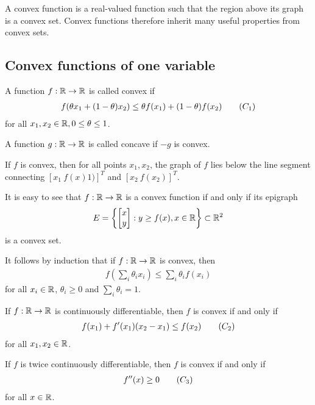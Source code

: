 A convex function is a real-valued function such that the region above its graph is a convex set.
Convex functions therefore inherit many useful properties from convex sets.

\subsection{Convex functions of one variable}

\begin{definition}
A function $f: \mathbb{R} \to \mathbb{R}$ is called convex if 
\begin{align}
f(\theta x_1 + (1-\theta) x_2) \le \theta f(x_1) + (1-\theta) f(x_2) \tag{$C_1$} \labeq{C1}
\end{align}
for all $x_1, x_2 \in \mathbb{R}, 0 \le \theta \le 1$.

A function $g: \mathbb{R} \to \mathbb{R}$ is called concave if $-g$ is convex.
\end{definition}

If $f$ is convex, then for all points $x_1, x_2$, the graph of $f$ lies below the line segment  connecting $[x_1 \ f(x)1)]^T$ and
$[x_2 \ f(x_2)]^T$.

It is easy to see that $f:\mathbb{R} \to \mathbb{R}$ is a convex function if and only if its epigraph
\begin{align}
E = \left\{ 
\begin{bmatrix}
x \\
y \\
\end{bmatrix} :
y \ge f(x), x \in \mathbb{R}
\right\} \subset \mathbb{R}^2
\end{align}
is a convex set.

\begin{remark}
It follows by induction that if $f: \mathbb{R} \to \mathbb{R}$ is convex, then
\begin{align}
f (\sum_{i} \theta_i x_i) \le \sum_{i} \theta_i f(x_i)
\end{align}
for all $x_i \in \mathbb{R}$, $\theta_i \ge 0$ and $\sum_{i} \theta_i = 1$.
\end{remark}

\begin{theorem}
If $f:\mathbb{R} \to \mathbb{R}$ is continuously differentiable, then $f$ is convex if and only if 
\begin{align}
f(x_1) + f'(x_1) (x_2 - x_1) \le f(x_2) \tag{$C_2$} \labeq{C2}
\end{align}
for all $x_1, x_2 \in \mathbb{R}$.

If $f$ is twice continuously differentiable, then $f$ is convex if and only if
\begin{align}
f''(x) \ge 0 \tag{$C_3$} \labeq{C3}
\end{align}
for all $x \in \mathbb{R}$.
\end{theorem}

